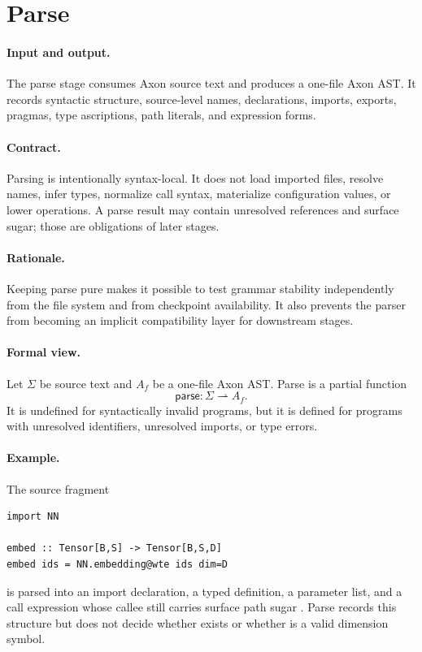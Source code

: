 \section{Parse}

\paragraph{Input and output.}
The parse stage consumes Axon source text and produces a one-file Axon AST.
It records syntactic structure, source-level names, declarations, imports,
exports, pragmas, type ascriptions, path literals, and expression forms.

\paragraph{Contract.}
Parsing is intentionally syntax-local.  It does not load imported files,
resolve names, infer types, normalize call syntax, materialize configuration
values, or lower operations.  A parse result may contain unresolved references
and surface sugar; those are obligations of later stages.

\paragraph{Rationale.}
Keeping parse pure makes it possible to test grammar stability independently
from the file system and from checkpoint availability.  It also prevents the
parser from becoming an implicit compatibility layer for downstream stages.

\paragraph{Formal view.}
Let \(\Sigma\) be source text and \(A_f\) be a one-file Axon AST.  Parse is a
partial function
\[
  \mathsf{parse}: \Sigma \rightharpoonup A_f .
\]
It is undefined for syntactically invalid programs, but it is defined for
programs with unresolved identifiers, unresolved imports, or type errors.

\paragraph{Example.}
The source fragment
\begin{verbatim}
import NN

embed :: Tensor[B,S] -> Tensor[B,S,D]
embed ids = NN.embedding@wte ids dim=D
\end{verbatim}
is parsed into an import declaration, a typed definition, a parameter list, and
a call expression whose callee still carries surface path sugar
.  Parse records this structure but does not decide whether
 exists or whether  is a valid dimension symbol.
